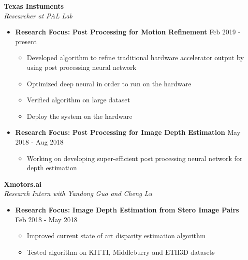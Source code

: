 \documentclass[10pt]{article}
\newenvironment{outerlist}[1][\enskip\textbullet]%
        {\begin{itemize}[#1,leftmargin=*]}{\end{itemize}%
         \vspace{-1.2\baselineskip}}
\newenvironment{innerlist}[1][\enskip\textbullet]%
        {\begin{itemize}[#1,leftmargin=*,parsep=0pt,itemsep=0pt,topsep=0pt,partopsep=0pt]}
        {\end{itemize}}
\begin{document}
\textbf{Texas Instuments } \\
\emph{Researcher at PAL Lab}
\begin{outerlist}
\vspace{-.1in}
\item[] \textbf{Research Focus: Post Processing for Motion Refinement} \hfill {Feb 2019 - present}
\begin{innerlist}
\vspace{-.05in}        
        \item Developed algorithm to refine traditional hardware accelerator output by using post processing neural network
        \item Optimized deep neural in order to run on the hardware
        \item Verified algorithm on large dataset 
        \item Deploy the system on the hardware
        \end{innerlist}
\vspace{-.05in}
\item[] \textbf{Research Focus: Post Processing for Image Depth Estimation} \hfill {May 2018 - Aug 2018}
        \begin{innerlist}
\vspace{-.05in}
        \item Working on developing super-efficient post processing neural network for depth estimation
	
        \end{innerlist}
\vspace{.15in}
\end{outerlist}


\textbf{Xmotors.ai } \\
\emph{Research Intern with Yandong Guo and Cheng Lu}
\begin{outerlist}
\vspace{-.1in}
\item[] \textbf{Research Focus: Image Depth Estimation from Stero Image Pairs} \hfill {Feb 2018 - May  2018}
        \begin{innerlist}
\vspace{-.05in}
        \item Improved current state of art disparity estimation algorithm
	\item Tested algorithm on KITTI, Middleburry and ETH3D datasets
	
        \end{innerlist}
\vspace{.15in}
\end{outerlist}
\end{document}
